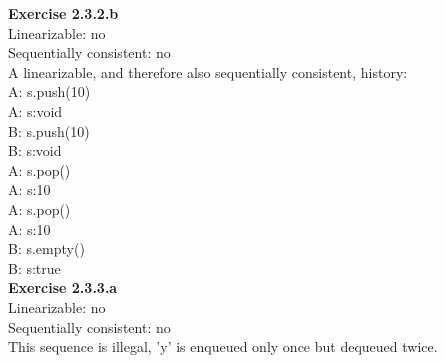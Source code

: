 \documentclass{article}
\begin{document}
\newpage

\noindent \textbf{Exercise 2.3.2.b} \\

\noindent Linearizable: no \\
Sequentially consistent: no \\

\noindent A linearizable, and therefore also sequentially consistent, history: \\

A: s.push(10) \\
A: s:void \\
B: s.push(10) \\
B: s:void \\
A: s.pop() \\
A: s:10 \\
A: s.pop() \\
A: s:10 \\
B: s.empty() \\
B: s:true \\

\noindent \textbf{Exercise 2.3.3.a} \\

\noindent Linearizable: no \\
Sequentially consistent: no \\


\noindent This sequence is illegal, 'y' is enqueued only once but dequeued twice.
\end{document}
